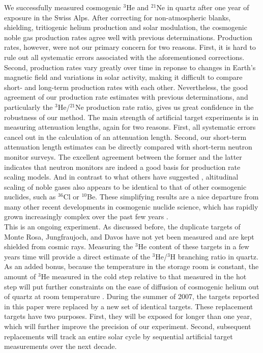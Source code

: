 \documentclass{article}
\begin{document}
We  successfully measured  cosmogenic $^3$He  and $^{21}$Ne  in quartz
after one  year of  exposure in the  Swiss Alps. After  correcting for
non-atmospheric blanks,  shielding, tritiogenic helium  production and
solar modulation, the cosmogenic noble gas production rates agree well
with previous determinations. Production  rates, however, were not our
primary concern  for two reasons.  First,  it is hard to  rule out all
systematic  errors  associated with  the  aforementioned corrections.  
Second, production rates vary greatly  over time in reponse to changes
in Earth's magnetic field and  variations in solar activity, making it
difficult to  compare short- and long-term production  rates with each
other.   Nevertheless,  the  good  agreement of  our  production  rate
estimates   with  previous   determinations,   and  particularly   the
$^3$He/$^{21}$Ne production  rate ratio, gives us  great confidence in
the robustness of our method.   The main strength of artificial target
experiments  is  in  measuring  attenuation  lengths,  again  for  two
reasons.  First,  all systematic errors cancel out  in the calculation
of an  attenuation length.  Second, our  short-term attenuation length
estimates  can be  directly compared  with short-term  neutron monitor
surveys.  The  excellent agreement between  the former and  the latter
indicates that neutron monitors are indeed a good basis for production
rate scaling  models.  And in  contrast to what others  have suggested
\citep{amidon2008}, altitudinal scaling of noble gases also appears to
be identical to  that of other cosmogenic nuclides,  such as $^{36}$Cl
or  $^{10}$Be.  These simplifying  results are  a nice  departure from
many other  recent developments  in cosmogenic nuclide  science, which
has rapidly grown increasingly complex over the past few years
\citep[e.g., ][]{pigati2004, staiger2007, lifton2008}.  \\

This  is an ongoing  experiment.  As  discussed before,  the duplicate
targets  of Monte  Rosa, Jungfraujoch,  and  Davos have  not yet  been
measured and are kept shielded  from cosmic rays. Measuring the $^3$He
content of  these targets in  a few years  time will provide  a direct
estimate of  the $^3$He/$^3$H branching  ratio in quartz. As  an added
bonus, because  the temperature in  the storage room is  constant, the
amount of $^3$He  measured in the cold step  relative to that measured
in the hot step will put  further constraints on the ease of diffusion
of   cosmogenic   helium   out   of   quartz   at   room   temperature
\citep{shuster2005}.  During the summer  of 2007, the targets reported
in this paper were replaced by  a new set of identical targets.  These
replacement targets have two purposes. First, they will be exposed for
longer than one year, which  will further improve the precision of our
experiment. Second, subsequent replacements will track an entire solar
cycle by sequential artificial target measurements over the next
decade.  \\
\end{document}
